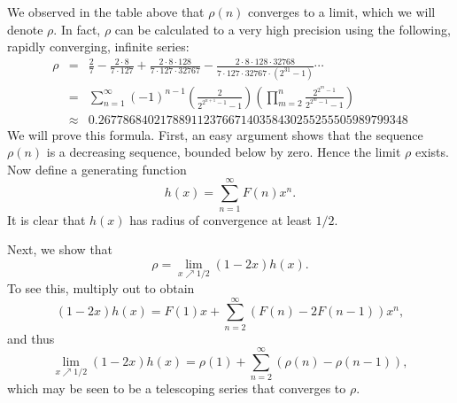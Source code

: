 \documentclass[12pt]{article}
\begin{document}
We observed in the table above that $\rho(n)$ converges to a limit,
which we will denote $\rho$.  In fact, $\rho$ can
be calculated to a very high precision using the following, 
rapidly converging, infinite series:
\begin{eqnarray*} 
  \rho 
  &=& 
  \frac27 - \frac{2\cdot8}{7\cdot127} + 
  \frac{2\cdot8\cdot128}{7\cdot127\cdot32767} 
  - \frac{2\cdot8\cdot128\cdot32768}{7\cdot127\cdot32767\cdot(2^{31}-1)}
  \cdots \\
  &=&
  \sum_{n=1}^\infty (-1)^{n-1}
  \left(\frac2{2^{2^{n+1}-1}-1}\right)
  \left(\prod_{m=2}^n \frac{2^{2^m-1}}{2^{2^m-1}-1}\right) \\
  &\approx&
  0.26778684021788911237667140358430255255505989799348
\end{eqnarray*}
We will prove this formula.
First, an easy argument shows that the sequence $\rho(n)$ is a 
decreasing sequence, bounded below by zero.  
Hence the limit $\rho$ exists.  Now define 
a generating function
$$ h(x) = \sum_{n=1}^\infty F(n) x^n .$$
It is clear that $h(x)$ has radius of convergence at least $1/2$.

Next, we show that
\[ \rho = \lim_{x\nearrow1/2} (1-2x) h(x) .\]
To see this, multiply out to obtain
\[ (1-2x) h(x) = F(1) x + \sum_{n=2}^\infty (F(n) - 2 F(n-1)) x^n ,\]
and thus
\[ \lim_{x\nearrow1/2} (1-2x) h(x) = \rho(1)
   + \sum_{n=2}^\infty (\rho(n) - \rho(n-1)) ,\]
which may be seen to be a telescoping series that converges to $\rho$.
\end{document}
